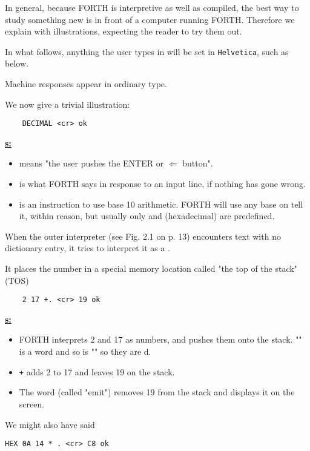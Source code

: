 In general, because FORTH is interpretive as well as compiled, the best way to study something new is in front of a computer running FORTH. Therefore we explain with illustrations, expecting the reader to try them out.

In what follows, anything the user types in will be set in \lstinline$Helvetica$, such as  below.

Machine responses appear in ordinary type.

We now give a trivial illustration:

\begin{lstlisting}
    DECIMAL <cr> ok
\end{lstlisting}

\Note \textbf{\underline{s:}}
\begin{itemize}
  \item {} means "the user pushes the ENTER or $\Leftarrow$ button".
  \item {} is what FORTH says in response to an input line, if nothing has gone wrong.
  \item {} is an instruction to use base 10 arithmetic. FORTH will use any base on tell it, within reason, but usually only  and  (hexadecimal) are predefined.
\end{itemize}

When the outer interpreter (see Fig. 2.1 on p. 13) encounters text with no dictionary entry, it tries to interpret it as a .

It places the number in a special memory location called "the top of the stack" (TOS)
\begin{lstlisting}
    2 17 +. <cr> 19 ok
\end{lstlisting}

\Note \textbf{\underline{s:}}
\begin{itemize}
  \item FORTH interprets 2 and 17 as numbers, and pushes them onto the stack. "\bc{+}" is a word and so is "" so they are d.
  \item \lstinline$+$ adds 2 to 17 and leaves 19 on the stack.
  \item The word  (called "emit") removes 19 from the stack and displays it on the screen.
\end{itemize}

We might also have said

\begin{lstlisting}
HEX 0A 14 * . <cr> C8 ok
\end{lstlisting}

